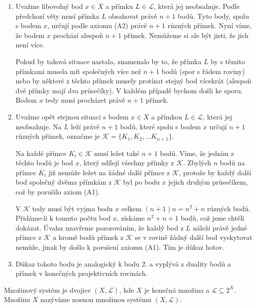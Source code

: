 \begin{t_proof}
  \begin{enumerate}
    \item
    Uvažme libovolný bod $x\in X$ a přímku $L\in\mathcal{L}$, která jej neobsahuje. Podle předchozí věty musí přímka $L$ obsahovat právě $n+1$ bodů. Tyto body, spolu s bodem $x$, určují podle axiomu (A2) právě $n+1$ různých přímek. Nyní víme, že bodem $x$ prochází alespoň $n+1$ přímek. Nemůžeme si ale být jisti, že jich není více.
    
    Pokud by taková situace nastala, znamenalo by to, že přímka $L$ by s těmito přímkami musela mít společných více než $n+1$ bodů (spor s řádem roviny) nebo by některé z těchto přímek musely protínat stejný bod vícekrát (alespoň dvě přímky mají dva průsečíky). V každém případě bychom došli ke sporu. Bodem $x$ tedy musí procházet právě $n+1$ přímek.
    
    \item
    Uvažme opět stejnou situaci s bodem $x\in X$ a přímkou $L\in\mathcal{L}$, která jej neobsahuje. Na $L$ leží právě $n+1$ bodů, které spolu s bodem $x$ určují $n+1$ různých přímek, označme je $\mathcal{K}=\{K_1, K_2,\dots K_{n+1}\}$.
    
    Na každé přímce $K_i\in\mathcal{K}$ musí ležet také $n+1$ bodů. Víme, že jedním z těchto bodů je bod $x$, který sdílejí všechny přímky z $\mathcal{K}$. Zbylých $n$ bodů na přímce $K_i$ již nemůže ležet na žádné další přímce z $\mathcal{K}$, protože by každý další bod společný dvěma přímkám z $\mathcal{K}$ byl po bodu $x$ jejich druhým průsečíkem, což by porušilo axiom (A1).
    
    V $\mathcal{K}$ tedy musí být vyjma bodu $x$ celkem $(n+1)n=n^2+n$ různých bodů. Přidáme-li k tomuto počtu bod $x$, získáme $n^2+n+1$ bodů, což jsme chtěli dokázat. Úvahu uzavřeme pozorováním, že každý bod z $L$ náleží právě jedné přímce z $\mathcal{K}$ a kromě bodů přímek z $\mathcal{K}$ se v rovině žádný další bod vyskytovat nemůže, jinak by došlo k porušení axiomu (A1). Tím je důkaz hotov.
    
    \item
    Důkaz tohoto bodu je analogický k bodu 2. a vyplývá z duality bodů a přímek v konečných projektivních rovinách.
  \end{enumerate}
\end{t_proof}

\begin{t_definition}
  Množinový systém je dvojice $(X,\mathcal{L})$, kde $X$ je konečná množina a $\mathcal{L}\subseteq 2^X$. Množinu $X$ nazýváme nosnou množinou systému $(X,\mathcal{L})$.
\end{t_definition}

